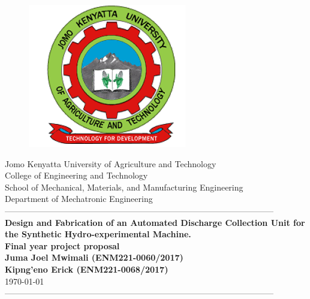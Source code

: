 \documentclass[12pt,fleqn]{article}
\newcommand{\yesthreeday}{{\AdvanceDate[-4]\today}}
\begin{document}
\begin{titlepage}
  \begin{center}
      \vspace*{-4.0cm}
    \begin{figure}[!h]
\centering
\includegraphics[width=0.3\linewidth]{Figures/JKUAT_logo}
\label{fig:jomologo}
\end{figure}
   \large{Jomo Kenyatta University of Agriculture and Technology}\\
    \large{College of Engineering and Technology}\\
    \large{School of Mechanical, Materials, and Manufacturing Engineering}\\
   \large{Department of Mechatronic Engineering}\\

    ------------------------------------------------------------------------------------------------\\[1.0cm]
    \LARGE{\textbf{Design and Fabrication of an Automated Discharge Collection Unit for the Synthetic Hydro-experimental Machine.}}\\[0.6cm]
    
    \LARGE{\textbf{Final year project proposal
            }}\\[1.5cm]

    \vspace{0.5cm}
    \large{\textbf{Juma Joel Mwimali (ENM221-0060/2017)
            }}\\
     \large{\textbf{Kipng'eno Erick (ENM221-0068/2017)
            }}\\[1.0cm]

    \large{\small{\yesthreeday}}\\
    ------------------------------------------------------------------------------------------------\\[1.5cm]
  \end{center}
\end{titlepage}
%
\end{document}
